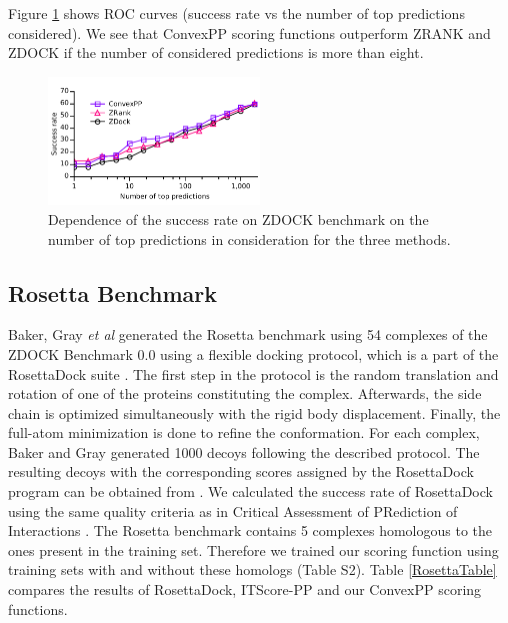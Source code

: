 Figure \ref{fig:ROC_ZDOCK} shows ROC curves (success rate vs the number of top predictions considered). 
We see that ConvexPP scoring functions outperform ZRANK and ZDOCK if the number of considered predictions is more than eight.

\begin{figure}[H]
\begin{center}
\includegraphics[width=0.5\textwidth]{Scoring/Fig/AllCurvesZDOCKU}
\caption[The success rate on ZDOCK benchmark]{Dependence of the success rate on ZDOCK benchmark on the number of top predictions in consideration for the three methods.}
\label{fig:ROC_ZDOCK} 
\end{center}
\end{figure}

\subsection{Rosetta Benchmark}

Baker, Gray \emph{et al} generated the Rosetta benchmark using 54 complexes of the ZDOCK Benchmark 0.0 \cite{Chen2002} using a flexible docking protocol, 
which is a part of the RosettaDock suite \cite{Gray2003}. 
The first step in the protocol is the 
random translation and rotation of one of the proteins constituting the complex. Afterwards, the side chain is optimized simultaneously with the rigid body displacement. Finally, the full-atom
minimization is done to refine the conformation. For each complex, Baker and Gray generated 1000 decoys following the described protocol. 
The resulting decoys with the corresponding scores assigned by the RosettaDock program can be obtained from \cite{RosettaDecoysLink}. We
calculated the success rate of RosettaDock using the same quality criteria as in Critical Assessment of PRediction of Interactions \cite{Mendez2003,Mendez2005,Janin2009}. 
The Rosetta benchmark contains 5 complexes homologous to the ones present in the training set. Therefore we
trained our scoring function using training sets with and without these homologs (Table S2). 
Table \ref{RosettaTable} compares the results of RosettaDock\cite{Gray2003}, ITScore-PP\cite{Huang2008} and our ConvexPP scoring functions. 

